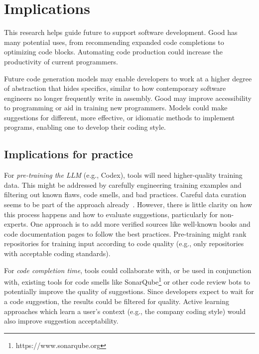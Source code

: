 \section{Implications}
This research helps guide future \cct{} to support software development. 
Good \cct{} has many potential uses, from recommending expanded code completions to optimizing code blocks. Automating code production could increase the productivity of current programmers. 

Future code generation models may enable developers to work at a higher degree of abstraction that hides specifics, similar to how contemporary software engineers no longer frequently write in assembly.
Good \cct{} may improve accessibility to programming or aid in training new programmers. Models could make suggestions for different, more effective, or idiomatic methods to implement programs, enabling one to develop their coding style.

\subsection{Implications for practice}
For \emph{pre-training the LLM} (e.g., Codex), \AISE{} tools will need higher-quality training data. This might be addressed by carefully engineering training examples and filtering out known flaws, code smells, and bad practices. Careful data curation seems to be part of the approach already~\cite{alphacode}. However, there is little clarity on how this process happens and how to evaluate suggestions, particularly for non-experts. One approach is to add more verified sources like well-known books and code documentation pages to follow the best practices. 
Pre-training might rank repositories for training input according to code quality (e.g., only repositories with acceptable coding standards). %

For \emph{code completion time}, \AISE{} tools could collaborate with, or be used in conjunction with, existing tools for code smells like SonarQube\footnote{https://www.sonarqube.org} or other code review bots to potentially improve the quality of suggestions. Since developers expect to wait for a code suggestion, the results could be filtered for quality. Active learning approaches which learn a user's context (e.g., the company coding style) would also improve suggestion acceptability. %

